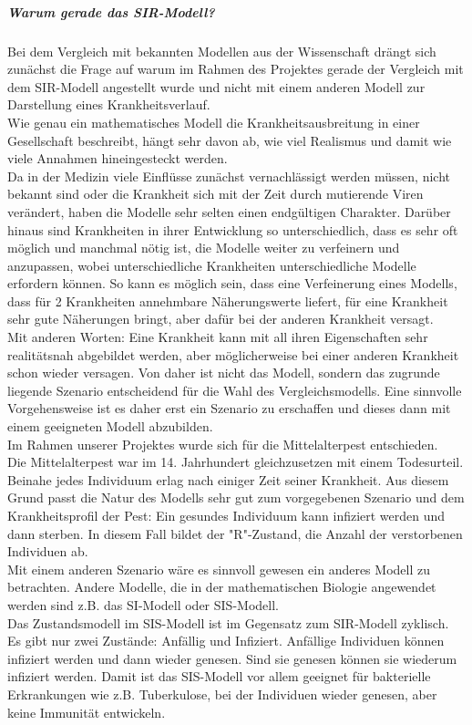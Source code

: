 \subparagraph{Warum gerade das SIR-Modell?}
Bei dem Vergleich mit bekannten Modellen aus der Wissenschaft drängt sich zunächst die Frage auf warum im Rahmen des Projektes gerade der Vergleich mit dem SIR-Modell angestellt wurde und nicht mit einem anderen Modell zur Darstellung eines Krankheitsverlauf.\\
Wie genau ein mathematisches Modell die Krankheitsausbreitung in einer Gesellschaft beschreibt, hängt sehr davon ab, wie viel Realismus und damit wie viele Annahmen hineingesteckt werden.\\
Da in der Medizin viele Einflüsse zunächst vernachlässigt werden müssen, nicht bekannt sind oder die Krankheit sich mit der Zeit durch mutierende Viren verändert, haben die Modelle sehr selten einen endgültigen Charakter. Darüber hinaus sind Krankheiten in ihrer Entwicklung so unterschiedlich, dass es sehr oft möglich und manchmal nötig ist, die Modelle weiter zu verfeinern und anzupassen, wobei unterschiedliche Krankheiten unterschiedliche Modelle erfordern können. 
So kann es möglich sein, dass eine Verfeinerung eines Modells, dass für 2 Krankheiten annehmbare Näherungswerte liefert, für eine Krankheit sehr gute Näherungen bringt, aber dafür bei der anderen Krankheit versagt.\\
Mit anderen Worten: Eine Krankheit kann mit all ihren Eigenschaften sehr realitätsnah abgebildet werden, aber möglicherweise bei einer anderen Krankheit schon wieder versagen. Von daher ist nicht das Modell, sondern das zugrunde liegende Szenario entscheidend für die Wahl des Vergleichsmodells. Eine sinnvolle Vorgehensweise ist es daher erst ein Szenario zu erschaffen und dieses dann mit einem geeigneten Modell abzubilden.\\ 
Im Rahmen unserer Projektes wurde sich für die Mittelalterpest entschieden.\\ 
Die Mittelalterpest war im 14. Jahrhundert gleichzusetzen mit einem Todesurteil. Beinahe jedes Individuum erlag nach einiger Zeit seiner Krankheit. Aus diesem Grund passt die Natur des Modells sehr gut zum vorgegebenen Szenario und dem Krankheitsprofil der Pest: Ein gesundes Individuum kann infiziert werden und dann sterben. In diesem Fall bildet der "R"-Zustand, die Anzahl der verstorbenen Individuen ab.\\
Mit einem anderen Szenario wäre es sinnvoll gewesen ein anderes Modell zu betrachten. 
Andere Modelle, die in der mathematischen Biologie angewendet werden sind z.B. das SI-Modell oder SIS-Modell.\\
Das Zustandsmodell im SIS-Modell ist im Gegensatz zum SIR-Modell zyklisch. Es gibt nur zwei Zustände: Anfällig und Infiziert. Anfällige Individuen können infiziert werden und dann wieder genesen. Sind sie genesen können sie wiederum infiziert werden. Damit ist das SIS-Modell vor allem geeignet für bakterielle Erkrankungen wie z.B. Tuberkulose, bei der Individuen wieder genesen, aber keine Immunität entwickeln. \\
